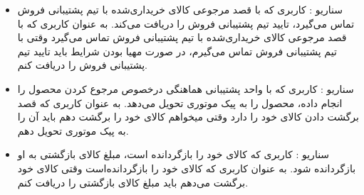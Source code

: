 \documentclass[14pt]{article}
\begin{document}
\begin{flushright}
\begin{itemize}
\item سناریو : کاربری که با قصد مرجوعی کالای خریداری‌شده با تیم پشتیبانی فروش تماس می‌گیرد، تایید تیم پشتیبانی فروش را دریافت می‌کند.
\newline
به عنوان کاربری که با قصد مرجوعی کالای خریداری‌شده با تیم پشتیبانی فروش تماس می‌گیرد
\newline
وقتی با تیم پشتیبانی فروش تماس می‌گیرم، در صورت مهیا بودن شرایط
\newline
باید تایید تیم پشتیبانی فروش را دریافت کنم.

\item سناریو : کاربری که با واحد پشتیبانی هماهنگی درخصوص مرجوع کردن محصول را انجام داده، محصول را به پیک موتوری تحویل می‌دهد.
\newline
به عنوان کاربری که قصد برگشت دادن کالای خود را دارد
\newline
وقتی میخواهم کالای خود را برگشت دهم
\newline
باید آن را به پیک موتوری تحویل دهم.

\item سناریو : کاربری که کالای خود را بازگردانده است، مبلغ کالای بازگشتی به او بازگردانده شود.
\newline
به عنوان کاربری که کالای خود را بازگردانده‌است
\newline
وقتی کالای خود برگشت می‌دهم
\newline
باید مبلغ کالای بازگشتی را دریافت کنم.



\end{itemize}
\end{flushright}
\end{document}
